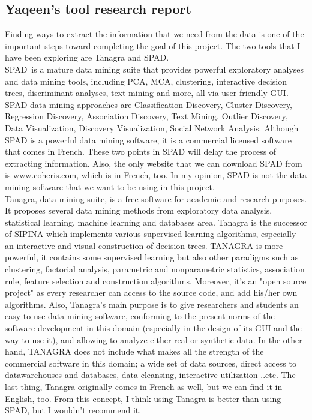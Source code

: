 \documentclass[11pt]{article}
\begin{document}
	\subsection{Yaqeen's tool research report}
	Finding ways to extract the information that we need from the data is one of the important steps toward completing the goal of this project. The two tools that I have been exploring are Tanagra and SPAD. \\
\hfill \break
SPAD is a mature data mining suite that provides powerful exploratory analyses and data mining tools, including PCA, MCA, clustering, interactive decision trees, discriminant analyses, text mining and more, all via user-friendly GUI. SPAD data mining approaches are Classification Discovery, Cluster Discovery, Regression Discovery, Association Discovery, Text Mining, Outlier Discovery, Data Visualization, Discovery Visualization, Social Network Analysis. Although SPAD is a powerful data mining software, it is a commercial licensed software that comes in French. These two points in SPAD will delay the process of extracting information. Also, the only website that we can download SPAD from is www.coheris.com, which is in French, too. In my opinion, SPAD is not the data mining software that we want to be using in this project. \\
\hfil \break
Tanagra, data mining suite, is a free software for academic and research purposes. It proposes several data mining methods from exploratory data analysis, statistical learning, machine learning and databases area. Tanagra is the successor of SIPINA which implements various supervised learning algorithms, especially an interactive and visual construction of decision trees. TANAGRA is more powerful, it contains some supervised learning but also other paradigms such as clustering, factorial analysis, parametric and nonparametric statistics, association rule, feature selection and construction algorithms. Moreover, it’s an "open source project" as every researcher can access to the source code, and add his/her own algorithms. Also, Tanagra’s main purpose is to give researchers and students an easy-to-use data mining software, conforming to the present norms of the software development in this domain (especially in the design of its GUI and the way to use it), and allowing to analyze either real or synthetic data. In the other hand, TANAGRA does not include what makes all the strength of the commercial software in this domain; a wide set of data sources, direct access to datawarehouses and databases, data cleansing, interactive utilization ..etc. The last thing, Tanagra originally comes in French as well, but we can find it in English, too. From this concept, I think using Tanagra is better than using SPAD, but I wouldn’t recommend it. \\
\end{document}
